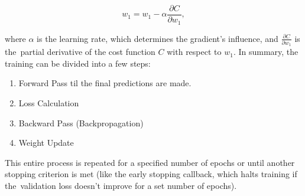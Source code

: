 %
%
%
%
\begin{equation*}
	w_1= w_1 -\alpha \frac{\partial C}{\partial w_1} ,
\end{equation*}

where $\alpha$ is the learning rate, which determines the gradient’s influence, and $\frac{\partial C}{\partial w_1} $ is the~partial derivative of the cost function $C$ with respect to $w_1$.\newline
In summary, the training can be divided into a few steps:
\begin{enumerate}[label=\arabic*.]
	\item Forward Pass til the final predictions are made.
	\item Loss Calculation
	\item Backward Pass (Backpropagation)
	\item Weight Update
\end{enumerate}
This entire process is repeated for a specified number of epochs or until another stopping criterion is met (like the early stopping callback, which halts training if the~validation loss doesn't improve for a set number of epochs).


